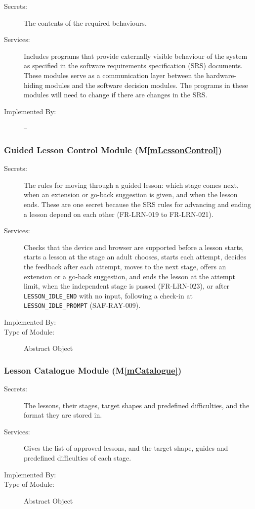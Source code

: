 \documentclass[12pt, titlepage]{article}
\newcommand{\mref}[1]{M\ref{#1}}
\begin{document}
\begin{description}
\item[Secrets:] The contents of the required behaviours.
\item[Services:] Includes programs that provide externally visible behaviour of
  the system as specified in the software requirements specification (SRS)
  documents. These modules serve as a communication layer between the
  hardware-hiding modules and the software decision modules. The programs in
  these modules will need to change if there are changes in the SRS.
\item[Implemented By:] --
\end{description}

\subsubsection{Guided Lesson Control Module (\mref{mLessonControl})}

\begin{description}
\item[Secrets:] The rules for moving through a guided lesson: which stage comes
  next, when an extension or go-back suggestion is given, and when the lesson
  ends. These are one secret because the SRS rules for advancing and ending a
  lesson depend on each other (FR-LRN-019 to FR-LRN-021).
\item[Services:] Checks that the device and browser are supported before a
  lesson starts, starts a lesson at the stage an adult chooses, starts each
  attempt, decides the feedback after each attempt, moves to the next stage,
  offers an extension or a go-back suggestion, and ends the lesson at the
  attempt limit, when the independent stage is passed (FR-LRN-023), or after
  \texttt{LESSON\_IDLE\_END} with no input, following a check-in at
  \texttt{LESSON\_IDLE\_PROMPT} (SAF-RAY-009).
\item[Implemented By:] \progname{}
\item[Type of Module:] Abstract Object
\end{description}

\subsubsection{Lesson Catalogue Module (\mref{mCatalogue})}

\begin{description}
\item[Secrets:] The lessons, their stages, target shapes and predefined
  difficulties, and the format they are stored in.
\item[Services:] Gives the list of approved lessons, and the target shape,
  guides and predefined difficulties of each stage.
\item[Implemented By:] \progname{}
\item[Type of Module:] Abstract Object
\end{description}
\end{document}
